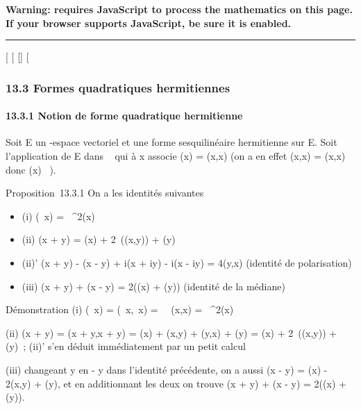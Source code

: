 \textbf{Warning: 
requires JavaScript to process the mathematics on this page.\\ If your
browser supports JavaScript, be sure it is enabled.}

\begin{center}\rule{3in}{0.4pt}\end{center}

{[}
{[}
{[}{]}
{[}

\subsubsection{13.3 Formes quadratiques hermitiennes}

\paragraph{13.3.1 Notion de forme quadratique hermitienne}

Soit E un -espace vectoriel et \phi une forme sesquilinéaire hermitienne
sur E. Soit \Phi l'application de E dans ~ qui à x associe \Phi(x) = \phi(x,x)
(on a en effet \phi(x,x) = \overline\phi(x,x) donc \Phi(x) \in
{}~).

Proposition~13.3.1 On a les identités suivantes

\begin{itemize}
\itemsep1pt\parskip0pt
\item
  (i) \Phi(\lambda~x) = \textbar{}\lambda~\textbar{}^2\Phi(x)
\item
  (ii) \Phi(x + y) = \Phi(x) +
  2\mathrmRe~(\phi(x,y)) + \Phi(y)
\item
  (ii)' \Phi(x + y) - \Phi(x - y) + i\Phi(x + iy) - i\Phi(x - iy) = 4\phi(y,x)
  (identité de polarisation)
\item
  (iii) \Phi(x + y) + \Phi(x - y) = 2(\Phi(x) + \Phi(y)) (identité de la médiane)
\end{itemize}

Démonstration (i) \Phi(\lambda~x) = \phi(\lambda~x,\lambda~x) =
\lambda~\overline\lambda~\phi(x,x) =
\textbar{}\lambda~\textbar{}^2\Phi(x)

(ii) \Phi(x + y) = \phi(x + y,x + y) = \Phi(x) + \phi(x,y) + \phi(y,x) + \Phi(y) = \Phi(x) +
2\mathrmRe~(\phi(x,y)) + \Phi(y)~;
(ii)' s'en déduit immédiatement par un petit calcul

(iii) changeant y en - y dans l'identité précédente, on a aussi \Phi(x - y)
= \Phi(x) - 2\phi(x,y) + \Phi(y), et en additionnant les deux on trouve \Phi(x + y)
+ \Phi(x - y) = 2(\Phi(x) + \Phi(y)).

